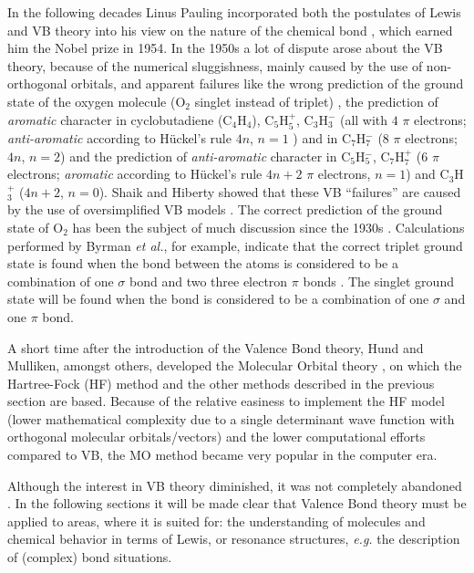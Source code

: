 In the following decades Linus Pauling incorporated both the postulates of Lewis and VB theory into his view on the nature of the chemical bond \cite{pauling1,pauling2,pauling3,pauling4,pauling5,pauling6,pauling7,paulingbook}, which earned him the Nobel prize in 1954. In the 1950s a lot of dispute arose about the VB theory, because of the numerical sluggishness, mainly caused by the use of non-orthogonal orbitals, and apparent failures like the wrong prediction of the ground state of the oxygen molecule (O$_2$ singlet instead of triplet) \cite{carsten}, the prediction of \textit{aromatic} character in cyclobutadiene (C$_4$H$_4$), C$_5$H$_{5}^{+}$, C$_3$H$_{3}^{-}$ (all with $4$ $\pi$ electrons; \textit{anti-aromatic} according to H\"{u}ckel's rule $4n$, $n=1$ \cite{march}) and in C$_7$H$_{7}^{-}$ (8 $\pi$ electrons; $4n$, $n=2$) and the prediction of \textit{anti-aromatic} character in C$_5$H$_{5}^{-}$, C$_7$H$_{7}^{+}$ (6 $\pi$ electrons; \textit{aromatic} according to H\"{u}ckel's rule $4n+2$ $\pi$ electrons, $n=1$) and C$_3$H$_{3}^{+}$ ($4n+2$, $n=0$). Shaik and Hiberty showed that these VB ``failures'' are caused by the use of oversimplified VB models \cite{antibrush}. The correct prediction of the ground state of O$_2$ has been the subject of much discussion since the 1930s \cite{o2_1,o2_2,o2_3,o2_4,o2_5,o2_6,o2_7,o2_8,o2_9,carsten}. Calculations performed by Byrman \textit{et al.}, for example, indicate that the correct triplet ground state is found when the bond between the atoms is considered to be a combination of one $\sigma$ bond and two three electron $\pi$ bonds \cite{carsten}. The singlet ground state will be found when the bond is considered to be a combination of one $\sigma$ and one $\pi$ bond.

A short time after the introduction of the Valence Bond theory, Hund and Mulliken, amongst others, developed the Molecular Orbital theory \cite{hund,mulliken}, on which the Hartree-Fock (HF) method and the other methods described in the previous section are based. Because of the relative easiness to implement the HF model (lower mathematical complexity due to a single determinant wave function with orthogonal molecular orbitals/vectors) and the lower computational efforts compared to VB, the MO method became very popular in the computer era.

Although the interest in VB theory diminished, it was not completely abandoned \cite{vboverv1,vboverv2,vboverv3}. In the following sections it will be made clear that Valence Bond theory must be applied to areas, where it is suited for: the understanding of molecules and chemical behavior in terms of Lewis, or resonance structures, \textit{e.g.} the description of (complex) bond situations.

